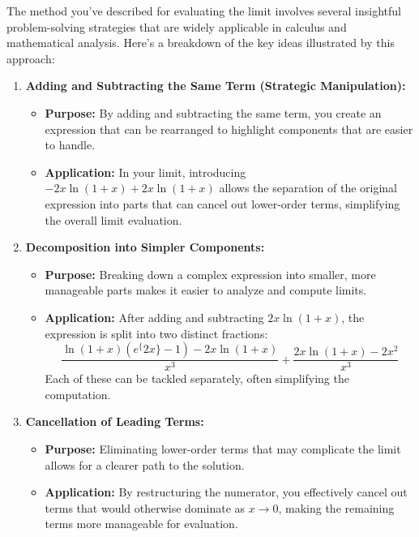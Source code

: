\documentclass[a4paper,12pt]{book}
\begin{document}
The method you've described for evaluating the limit involves several insightful problem-solving strategies that are widely applicable in calculus and mathematical analysis. Here's a breakdown of the key ideas illustrated by this approach:
\begin{enumerate}
\item 
\textbf{Adding and Subtracting the Same Term (Strategic Manipulation):}
\begin{itemize}
\item 
\textbf{Purpose:} By adding and subtracting the same term, you create an expression that can be rearranged to highlight components that are easier to handle.

\item 
\textbf{Application:} In your limit, introducing \( -2x\ln(1+x) + 2x\ln(1+x) \) allows the separation of the original expression into parts that can cancel out lower-order terms, simplifying the overall limit evaluation.

\end{itemize}

\item 
\textbf{Decomposition into Simpler Components:}
\begin{itemize}
\item 
\textbf{Purpose:} Breaking down a complex expression into smaller, more manageable parts makes it easier to analyze and compute limits.

\item 
\textbf{Application:} After adding and subtracting \( 2x\ln(1+x) \), the expression is split into two distinct fractions:
\[
\frac{\ln(1+x)(e^\{2x\}-1) - 2x\ln(1+x)}{x^3} + \frac{2x\ln(1+x) - 2x^2}{x^3}
\]
Each of these can be tackled separately, often simplifying the computation.

\end{itemize}

\item 
\textbf{Cancellation of Leading Terms:}
\begin{itemize}
\item 
\textbf{Purpose:} Eliminating lower-order terms that may complicate the limit allows for a clearer path to the solution.

\item 
\textbf{Application:} By restructuring the numerator, you effectively cancel out terms that would otherwise dominate as \( x \to 0 \), making the remaining terms more manageable for evaluation.

\end{itemize}


\end{enumerate}
\end{document}
